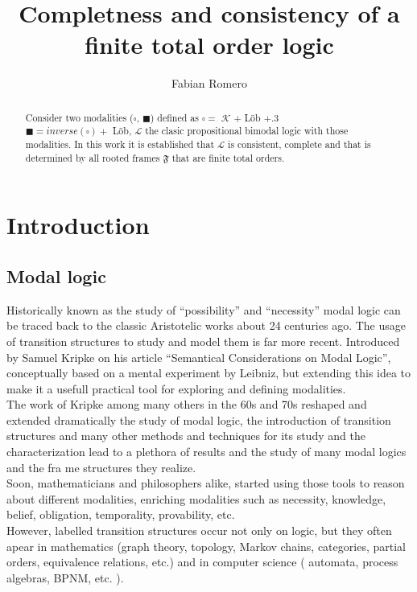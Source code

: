 \documentclass{tufte-handout}
\title{Completness and consistency of a finite total order logic}
\author[Fabian Romero]{Fabian Romero}
\begin{document}
\maketitle

\begin{abstract}
\noindent
Consider two modalities ($\square$, $\blacksquare$) defined as $\square= $ $\mathcal{K}$ $ + $ L\"ob $+ .3 $\\ $\blacksquare = inverse(\square) + $ L\"ob, $\mathcal{L}$ the clasic propositional bimodal logic with those modalities. In this work it is established that $\mathcal{L}$ is consistent, complete and that is determined by all rooted frames $\mathfrak{F}$  that are finite total orders.
\end{abstract}

\section{Introduction}\label{sec:Forewor}
\subsection{Modal logic}\label{sec:lts}

Historically known as the study of ``possibility'' and ``necessity'' modal logic can be traced back to the classic Aristotelic works about 24 centuries ago. The usage of transition structures to study and model them is far more recent. Introduced by Samuel Kripke on his article ``Semantical Considerations on Modal Logic''\cite{Kri63}, conceptually based on a mental experiment by Leibniz, but extending this idea to make it a usefull practical tool for exploring and defining modalities.\\

The work of Kripke among many others in the 60s and 70s reshaped and extended dramatically the study of modal logic, the introduction of transition structures and many other methods and techniques for its study and the characterization lead to a plethora of results and the study of many modal logics and the fra me structures they realize.\\

Soon, mathematicians and philosophers alike, started using those tools to reason about different modalities, enriching modalities such as necessity, knowledge, belief, obligation, temporality, provability, etc.\\

However, labelled transition structures occur not only on logic, but they often apear in mathematics (graph theory, topology, Markov chains, categories,  partial orders, equivalence relations, etc.) and in computer science ( automata, process algebras, BPNM,  etc. ).\\
\end{document}
